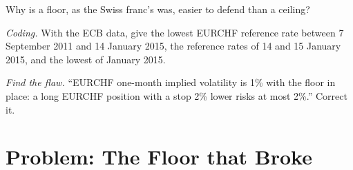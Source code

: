 \begin{exercise}[$\star\star$]\label{exo:m2:emerging-market-fx-and-ndfs:6}
Why is a floor, as the Swiss franc's was, easier to defend than a ceiling?
\end{exercise}

\begin{exercise}[$\star\star\star$]\label{exo:m2:emerging-market-fx-and-ndfs:7}
\emph{Coding.} With the ECB data, give the lowest EURCHF reference rate between
7 September 2011 and 14 January 2015, the reference rates of 14 and 15 January
2015, and the lowest of January 2015.
\end{exercise}

\begin{exercise}[$\star\star\star$]\label{exo:m2:emerging-market-fx-and-ndfs:8}
\emph{Find the flaw.} ``EURCHF one-month implied volatility is 1\% with the
floor in place: a long EURCHF position with a stop 2\% lower risks at most 2\%.''
Correct it.
\end{exercise}

\section{Problem: The Floor that Broke}

